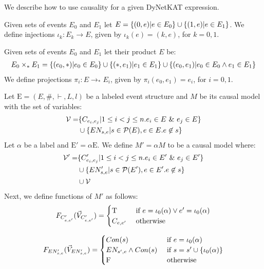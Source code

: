 We describe how to use causality for a given DyNetKAT expression.

\begin{definition}
    Given sets of events $E_0$ and $E_1$ let
    $E = \{(0,e)|e \in E_0\} \cup \{(1,e)|e \in E_1\}$.
    We define injections $\iota_k: E_k \rightarrow E$, given by
    $\iota_k(e) = (k,e)$, for $k = 0,1$.
\end{definition}

\begin{definition}
    Given sets of events $E_0$ and $E_1$ let their product $E$ be:
    \begin{align*}
        E_0 \times_* E_1 = \{(e_0,*)|e_0 \in E_0\} \cup \{(*,e_1)|e_1 \in E_1\}
        \cup \{(e_0,e_1)|e_0 \in E_0 \wedge e_1 \in E_1\}
    \end{align*}
    We define projections $\pi_i: E \rightarrow_* E_i$, given by
    $\pi_i(e_0,e_1) = e_i$, for $i=0,1$.
\end{definition}

\begin{definition}
    Let $\mathrm{E} = (E,\#,\vdash,L,l)$ be a labeled event structure and
    $M$ be its causal model with the set of variables:
    \begin{align*}
        \mathcal{V} = & \{C_{e_i,e_j} |  1 \leq i < j \leq n.
        e_i \in E \ \& \  e_j \in E\}                                \\
                      & \cup \{EN_{s,e} | s \in \mathcal{P}(E),
            e \in E. e \not \in s \}
    \end{align*}
    Let $\alpha$ be a label and $\mathrm{E'} = \alpha \mathrm{E}$.
    We define $M' = \alpha M$ to be a causal model where:
    \begin{align*}
        \mathcal{V'} = & \{C'_{e_i,e_j} |  1 \leq i < j \leq n.
        e_i \in E' \ \& \  e_j \in E'\}                                 \\
                       & \cup \{EN'_{s,e} | s \in \mathcal{P}(E'),
        e \in E'. e \not \in s \}                                    \\
                       & \cup \mathcal{V}
    \end{align*}
    Next, we define functions of $M'$ as follows:
    $$
        F_{C'_{e,e'}}(\vec V_{C'_{e,e'}}) = \begin{cases}
            \mathrm{T}       & \text{ if } e = \iota_0(\alpha) \vee e' = \iota_0(\alpha) \\
            C_{e,e'} & \text{ otherwise }
        \end{cases}
    $$

    $$
        F_{EN'_{s,e}}(\vec V_{EN'_{s,e}}) = \begin{cases}
            Con(s)                  & \text{ if } e = \iota_0(\alpha)             \\
            EN_{s',e} \wedge Con(s) & \text{ if } s = s' \cup \{\iota_0(\alpha)\} \\
            \mathrm{F}                      & \text{ otherwise }
        \end{cases}
    $$
\end{definition}

